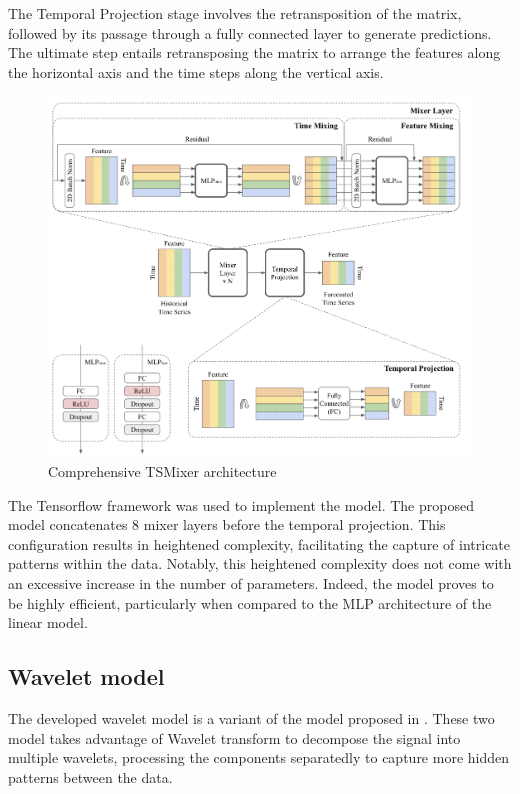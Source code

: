 The Temporal Projection stage involves the retransposition of the matrix, followed by its passage through a fully connected layer to generate predictions. The ultimate step entails retransposing the matrix to arrange the features along the horizontal axis and the time steps along the vertical axis.

\begin{figure}
    \centering
    \includegraphics[width=1\linewidth]{images/model architectures/tsmixermodel.png}
    \caption{Comprehensive TSMixer architecture \cite{chen2023tsmixer}}
    \label{fig:tsmixer-whole architecture}
\end{figure}

The Tensorflow framework was used to implement the model. The proposed model concatenates 8 mixer layers before the temporal projection. This configuration results in heightened complexity, facilitating the capture of intricate patterns within the data. Notably, this heightened complexity does not come with an excessive increase in the number of parameters. Indeed, the model proves to be highly efficient, particularly when compared to the MLP architecture of the linear model.

\subsection{Wavelet model}

The developed wavelet model is a variant of the model proposed in \cite{WaveletNLSTM}. These two model takes advantage of Wavelet transform to decompose the signal into multiple wavelets, processing the components separatedly to capture more hidden patterns between the data.

